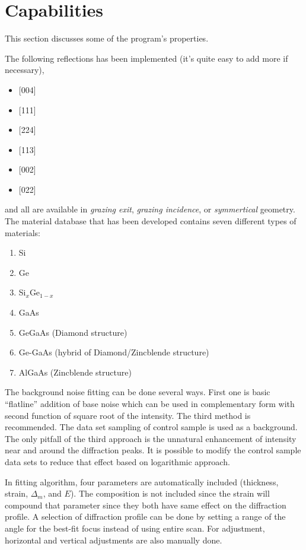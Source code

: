 \section{Capabilities}

This section discusses some of the program's properties.

The following reflections has been implemented (it's quite easy to add more if necessary),
{\SingleSpacing
\begin{itemize}
\item  {[004]}
\item {[111]}
\item {[224]}
\item { [113]}
\item{ [002]}
\item{ [022]}
\end{itemize}}
and all are available in \emph{grazing exit}, \emph{grazing incidence}, or \emph{symmertical} geometry.  The material database that has been developed contains seven different types of materials:
{\SingleSpacing
\begin{enumerate}
\item Si
\item Ge
\item Si$_{x}$Ge$_{1-x}$
\item GaAs
\item GeGaAs (Diamond structure)
\item Ge-GaAs (hybrid of Diamond/Zincblende structure)
\item AlGaAs (Zincblende structure)
\end{enumerate}}

The background noise fitting can be done several ways.  First one is basic ``flatline'' addition of base noise which can be used in complementary form with second function of square root of the intensity.  The third method is recommended.  The data set sampling of control sample is used as a background.  The only pitfall of the third approach is the unnatural enhancement of intensity near and around the diffraction peaks.  It is possible to modify the control sample data sets to reduce that effect based on logarithmic approach.

In fitting algorithm, four parameters are automatically included (thickness, strain, $\Delta_m$, and $E$).  The composition is not included since the strain will compound that parameter since they both have same effect on the diffraction profile.  A selection of diffraction profile can be done by setting a range of the angle for the best-fit focus instead of using entire scan.  For adjustment, horizontal and vertical adjustments are also manually done.


